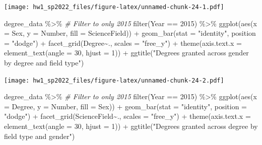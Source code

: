 \documentclass[
]{article}
\newenvironment{Shaded}{\begin{snugshade}}{\end{snugshade}}
\newcommand{\AttributeTok}[1]{\textcolor[rgb]{0.77,0.63,0.00}{#1}}
\newcommand{\CommentTok}[1]{\textcolor[rgb]{0.56,0.35,0.01}{\textit{#1}}}
\newcommand{\DecValTok}[1]{\textcolor[rgb]{0.00,0.00,0.81}{#1}}
\newcommand{\FunctionTok}[1]{\textcolor[rgb]{0.00,0.00,0.00}{#1}}
\newcommand{\NormalTok}[1]{#1}
\newcommand{\SpecialCharTok}[1]{\textcolor[rgb]{0.00,0.00,0.00}{#1}}
\newcommand{\StringTok}[1]{\textcolor[rgb]{0.31,0.60,0.02}{#1}}
\begin{document}
\texttt{[image: hw1\_sp2022\_files/figure-latex/unnamed-chunk-24-1.pdf]}

\begin{Shaded}
\begin{Highlighting}[]
\NormalTok{degree\_data }\SpecialCharTok{\%\textgreater{}\%}
  \CommentTok{\# Filter to only 2015}
  \FunctionTok{filter}\NormalTok{(Year }\SpecialCharTok{==} \DecValTok{2015}\NormalTok{) }\SpecialCharTok{\%\textgreater{}\%}
  \FunctionTok{ggplot}\NormalTok{(}\FunctionTok{aes}\NormalTok{(}\AttributeTok{x =}\NormalTok{ Sex, }\AttributeTok{y =}\NormalTok{ Number, }\AttributeTok{fill =}\NormalTok{ ScienceField)) }\SpecialCharTok{+}
  \FunctionTok{geom\_bar}\NormalTok{(}\AttributeTok{stat =} \StringTok{"identity"}\NormalTok{, }\AttributeTok{position =} \StringTok{"dodge"}\NormalTok{) }\SpecialCharTok{+}
  \FunctionTok{facet\_grid}\NormalTok{(Degree}\SpecialCharTok{\textasciitilde{}}\NormalTok{., }\AttributeTok{scales =} \StringTok{"free\_y"}\NormalTok{) }\SpecialCharTok{+}
  \FunctionTok{theme}\NormalTok{(}\AttributeTok{axis.text.x =} \FunctionTok{element\_text}\NormalTok{(}\AttributeTok{angle =} \DecValTok{30}\NormalTok{, }\AttributeTok{hjust =} \DecValTok{1}\NormalTok{)) }\SpecialCharTok{+}
  \FunctionTok{ggtitle}\NormalTok{(}\StringTok{"Degrees granted across gender by degree and field type"}\NormalTok{)}
\end{Highlighting}
\end{Shaded}

\texttt{[image: hw1\_sp2022\_files/figure-latex/unnamed-chunk-24-2.pdf]}

\begin{Shaded}
\begin{Highlighting}[]
\NormalTok{degree\_data }\SpecialCharTok{\%\textgreater{}\%}
  \CommentTok{\# Filter to only 2015}
  \FunctionTok{filter}\NormalTok{(Year }\SpecialCharTok{==} \DecValTok{2015}\NormalTok{) }\SpecialCharTok{\%\textgreater{}\%}
  \FunctionTok{ggplot}\NormalTok{(}\FunctionTok{aes}\NormalTok{(}\AttributeTok{x =}\NormalTok{ Degree, }\AttributeTok{y =}\NormalTok{ Number, }\AttributeTok{fill =}\NormalTok{ Sex)) }\SpecialCharTok{+}
  \FunctionTok{geom\_bar}\NormalTok{(}\AttributeTok{stat =} \StringTok{"identity"}\NormalTok{, }\AttributeTok{position =} \StringTok{"dodge"}\NormalTok{) }\SpecialCharTok{+}
  \FunctionTok{facet\_grid}\NormalTok{(ScienceField}\SpecialCharTok{\textasciitilde{}}\NormalTok{., }\AttributeTok{scales =} \StringTok{"free\_y"}\NormalTok{) }\SpecialCharTok{+}
  \FunctionTok{theme}\NormalTok{(}\AttributeTok{axis.text.x =} \FunctionTok{element\_text}\NormalTok{(}\AttributeTok{angle =} \DecValTok{30}\NormalTok{, }\AttributeTok{hjust =} \DecValTok{1}\NormalTok{)) }\SpecialCharTok{+}
  \FunctionTok{ggtitle}\NormalTok{(}\StringTok{"Degrees granted across degree by field type and gender"}\NormalTok{) }
\end{Highlighting}
\end{Shaded}
\end{document}
